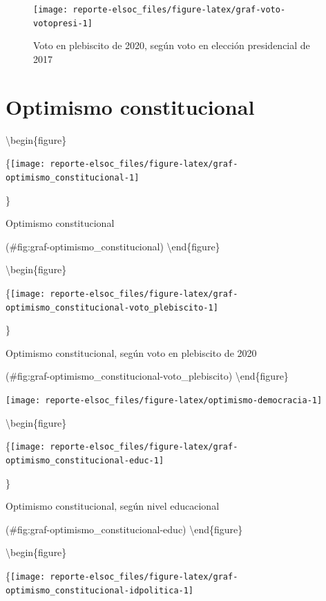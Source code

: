 \documentclass[
  12pt,
]{book}
\begin{document}
\begin{figure}

{\centering \texttt{[image: reporte-elsoc\_files/figure-latex/graf-voto-votopresi-1]} 

}

\caption{Voto en plebiscito de 2020, según voto en elección presidencial de 2017}\label{fig:graf-voto-votopresi}
\end{figure}

\hypertarget{optimismo-constitucional}{%
\section{Optimismo constitucional}\label{optimismo-constitucional}}

\textbackslash begin\{figure\}

\{\centering \texttt{[image: reporte-elsoc\_files/figure-latex/graf-optimismo\_constitucional-1]}

\}

\caption{Optimismo constitucional}

(\#fig:graf-optimismo\_constitucional)
\textbackslash end\{figure\}

\textbackslash begin\{figure\}

\{\centering \texttt{[image: reporte-elsoc\_files/figure-latex/graf-optimismo\_constitucional-voto\_plebiscito-1]}

\}

\caption{Optimismo constitucional, según voto en plebiscito de 2020}

(\#fig:graf-optimismo\_constitucional-voto\_plebiscito)
\textbackslash end\{figure\}

\begin{center}\texttt{[image: reporte-elsoc\_files/figure-latex/optimismo-democracia-1]} \end{center}

\textbackslash begin\{figure\}

\{\centering \texttt{[image: reporte-elsoc\_files/figure-latex/graf-optimismo\_constitucional-educ-1]}

\}

\caption{Optimismo constitucional, según nivel educacional}

(\#fig:graf-optimismo\_constitucional-educ)
\textbackslash end\{figure\}

\textbackslash begin\{figure\}

\{\centering \texttt{[image: reporte-elsoc\_files/figure-latex/graf-optimismo\_constitucional-idpolitica-1]}
\end{document}

